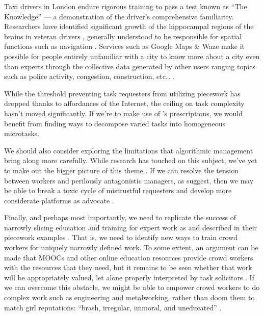 \documentclass[trackingWork]{subfiles}
\begin{document}
Taxi drivers in London endure rigorous training to pass a test known as ``The Knowledge''
--- a demonstration of the driver's comprehensive familiarity.
Researchers have identified significant growth of
the hippocampal regions of the brains in veteran drivers%
, generally understood to be responsible for spatial functions such as navigation
\cite{Maguire11042000,Maguire2894,Skok:1999:KML:299513.299625%
,       skok2000managing,Woollett1407,woollett2011acquiring}.
Services such as Google Maps \& Waze make it possible for
people entirely unfamiliar with a city
to know more about a city even than experts through
the collective data generated by other users
ranging topics such as police activity, congestion, construction, etc\dots
\cite{silva2013traffic,hind2014outsmarting}.

\subsubsubsection{\implication}
While the threshold preventing task requesters from utilizing piecework
has dropped thanks to affordances of the Internet, the ceiling on task complexity hasn't moved significantly.
If we're to make use of \citeauthor{Brown01041990}'s prescriptions,
we would benefit from finding ways to decompose varied tasks into homogeneous microtasks.

We should also consider exploring the limitations that algorithmic management bring along more carefully.
While research has touched on this subject, we've yet to make out the bigger picture of this theme
\cite{uberAlgorithm}.
If we can resolve the tension between workers and perilously antagonistic managers, as \citeauthor{10.2307/2118435} suggest,
then we may be able to break a toxic cycle of mistrustful requesters \cite[for example][]{MaliciouscrowdworkersGadiraju}
and develop more considerate platforms as \citeauthor{takingAHITMcInnis} advocate
\cite{takingAHITMcInnis}.

Finally, and perhaps most importantly,
we need to replicate the success of narrowly slicing education and training for expert work
as \citeauthor{hart2013rise} and \citeauthor{grier2013computers} described in their piecework examples
\cite{hart2013rise,grier2013computers}.
That is, we need to identify new ways to train crowd workers for uniquely narrowly defined work.
To some extent, an argument can be made that
MOOCs and other online education resources
provide crowd workers with the resources that they need, but 
it remains to be seen whether that work will be appropriately valued, let alone
properly interpreted by task solicitors
\cite{aguaded2013mooc}.
If we can overcome this obstacle,
we might be able to empower crowd workers to do complex work such as engineering and metalworking,
rather than doom them to match girl reputations:
``brash, irregular, immoral, and uneducated''
\cite{10.2307/3827491}.




\onlyinsubfile{
  \printbibliography
  }
\end{document}
